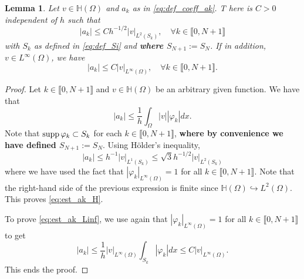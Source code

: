 \documentclass[11 pt]{article}
\newcommand\blue[1]{{\color{blue}\textbf{#1}}}
\newcommand\inter[1]{\llbracket #1\rrbracket}
\newtheorem{lemma}[theorem]{Lemma}
\numberwithin{equation}{section}
\begin{document}
%
\begin{lemma}\label{lem:bounds_aks}
Let $v\in \mathbb H(\Omega)$ and $a_k$ as in \eqref{eq:def_coeff_ak}. T
here is $C>0$ independent of $h$ such that
%
\begin{equation}\label{eq:est_ak_H}
    |a_k|\leq C h^{-1/2} |v|_{L^2(S_k)}, \quad\forall k\in\inter{0,N+1}
\end{equation}
%
with $S_k$ as defined in \eqref{eq:def_Si} and \blue{where $S_{N+1}:=S_N$}. If in addition, $v\in L^\infty(\Omega)$, we have
\begin{equation}\label{eq:est_ak_Linf}
    |a_k|\leq C |v|_{L^\infty(\Omega)}, \quad\forall k\in\inter{0,N+1}.
\end{equation}
\end{lemma}
%
\begin{proof}
Let $k\in\inter{0,N+1}$ and $v\in\mathbb H(\Omega)$ be an arbitrary given function. We have that
%
\begin{equation}
    |a_k|\leq \frac{1}{h}\int_{\Omega}|v||\varphi_k|dx.
\end{equation}
%
Note that $\textnormal{supp}\,\varphi_k\subset S_k$ for each $k\in\inter{0,N+1}$, \blue{where by convenience we have defined $S_{N+1}:=S_N$}. Using H\"older's inequality,
%
\begin{equation}
    |a_k|\leq h^{-1}|v|_{L^1(S_k)}\leq \sqrt{3}h^{-1/2}|v|_{L^2(S_k)}
\end{equation}
%
where we have used the fact that $|\varphi_k|_{L^\infty(\Omega)}=1$ for all $k\in\inter{0,N+1}$. Note that the right-hand side of the previous expression is finite since $\mathbb H(\Omega)\hookrightarrow L^2(\Omega)$. This proves \eqref{eq:est_ak_H}. 

To prove \eqref{eq:est_ak_Linf}, we use again that $|\varphi_k|_{L^\infty(\Omega)}=1$ for all $k\in\inter{0,N+1}$ to get
%
\begin{equation}
    |a_k|\leq \frac{1}{h}|v|_{L^\infty(\Omega)}\int_{S_k}|\varphi_k| dx \leq C|v|_{L^\infty(\Omega)}.
\end{equation}
%
This ends the proof.
\end{proof}
\end{document}
